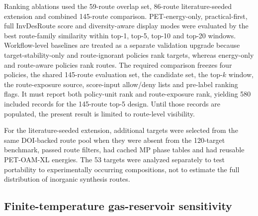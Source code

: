 \documentclass[11pt, letterpaper]{article}
\newcommand{\invdesroute}{InvDesRoute}
\begin{document}
Ranking ablations used the 59-route overlap set, 86-route literature-seeded extension and combined 145-route comparison. PET-energy-only, practical-first, full \invdesroute{} score and diversity-aware display modes were evaluated by the best route-family similarity within top-1, top-5, top-10 and top-20 windows. Workflow-level baselines are treated as a separate validation upgrade because target-stability-only and route-ignorant policies rank targets, whereas energy-only and route-aware policies rank routes. The required comparison freezes four policies, the shared 145-route evaluation set, the candidate set, the top-$k$ window, the route-exposure source, score-input allow/deny lists and pre-label ranking flags. It must report both policy-unit rank and route-exposure rank, yielding 580 included records for the 145-route top-5 design. Until those records are populated, the present result is limited to route-level visibility.

For the literature-seeded extension, additional targets were selected from the same DOI-backed route pool when they were absent from the 120-target benchmark, passed route filters, had cached MP phase tables and had reusable PET-OAM-XL energies. The 53 targets were analyzed separately to test portability to experimentally occurring compositions, not to estimate the full distribution of inorganic synthesis routes.

\subsection*{Finite-temperature gas-reservoir sensitivity}
\end{document}
